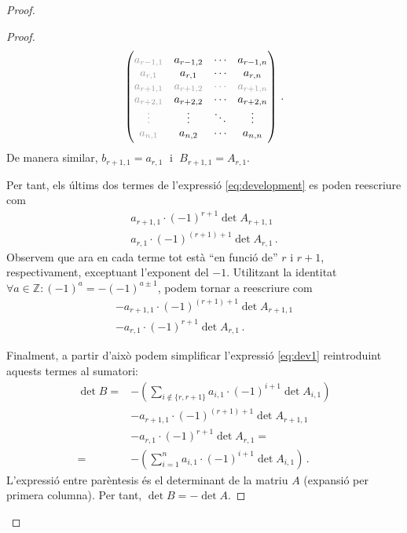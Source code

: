 \begin{teo}
\begin{proof}
\begin{lema}
\begin{adjustwidth}{0.8cm}{}
\begin{proof}
\begin{alignat*}{2}
\begin{pmatrix}
			\color[gray]{0.6}
			a_{r-1,1} &	a_{r-1,2} &	\cdots &	a_{r-1,n} \\
			\color[gray]{0.6}
			a_{r,1} &	a_{r,1} &	\cdots &	a_{r,n} \\
			\color[gray]{0.6}	a_{r+1,1} &	\color[gray]{0.6}a_{r+1,2} &\color[gray]{0.6}	\cdots &	\color[gray]{0.6}a_{r+1,n}  \\
			\color[gray]{0.6}
			a_{r+2,1} &	a_{r+2,2} &	\cdots &	a_{r+2,n} \\
			\color[gray]{0.6}
			\vdots &	\vdots &	\ddots &	\vdots \\
			\color[gray]{0.6}
			a_{n,1} &	a_{n,2} &	\cdots &	a_{n,n} \\
			\end{pmatrix}\,.
			\end{alignat*}
			De manera similar, $b_{r+1, 1} = a_{r, 1}\;$ i $\;B_{r+1,1} = A_{r,1}$.
			
			Per tant, els últims dos termes de l'expressió \eqref{eq:development} es poden reescriure com
			\begin{equation*}\label{eq:penult}
			\begin{gathered}
			a_{r+1,1}\cdot(-1)^{r+1}\det A_{r+1,1}\\
			a_{r,1}\cdot(-1)^{(r+1)+1}\det A_{r,1}\,.
			\end{gathered}
			\end{equation*}
			Observem que ara en cada terme tot està ``en funció de'' $r$ i $r+1$, respectivament, exceptuant l'exponent del $-1$. Utilitzant la identitat $\forall a\in\mathbb{Z} : (-1)^a = -(-1)^{a\pm 1}$, podem tornar a reescriure com
			\begin{equation*}\label{eq:last}
			\begin{gathered}
			-a_{r+1,1}\cdot(-1)^{(r+1)+1}\det A_{r+1,1}\\
			-a_{r,1}\cdot(-1)^{r+1}\det A_{r,1}\,.
			\end{gathered}
			\end{equation*}
			
			Finalment, a partir d'això podem simplificar l'expressió \eqref{eq:dev1} reintroduint aquests termes al sumatori:
			\begin{equation}\label{eq:development}
			\begin{split}
			\det B =& 	-\left(\sum_{i\notin \{r, r+1\}} a_{i,1}\cdot(-1)^{i+1}\det A_{i,1}\right)\\
			&	-a_{r+1,1}\cdot(-1)^{(r+1)+1}\det A_{r+1,1}\\
			&	-a_{r,1}\cdot(-1)^{r+1}\det A_{r,1} = \\
			=&-\left(\sum_{i=1}^{n} a_{i,1}\cdot(-1)^{i+1}\det A_{i,1}\right)\,.
			\end{split}
			\end{equation}
			L'expressió entre parèntesis és el determinant de la matriu $A$ (expansió per primera columna). Per tant, $\det B = -\det A$.
		\end{proof}
		\end{adjustwidth}
	\end{lema}


\end{proof}
\end{teo}
